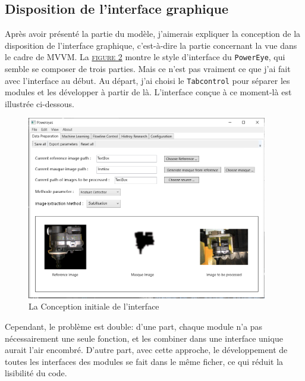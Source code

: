 \subsection{Disposition de l'interface graphique}
Après avoir présenté la partie du modèle, j'aimerais expliquer la conception de la disposition de l'interface graphique, c'est-à-dire la partie concernant la vue dans le cadre de MVVM. La \hyperref[fig:target]{\textsc{figure 2}} montre le style d'interface du \texttt{PowerEye}, qui semble se composer de trois parties. Mais ce n'est pas vraiment ce que j'ai fait avec l'interface au début. Au départ, j'ai choisi le \texttt{Tabcontrol} pour séparer les modules et les développer à partir de là. L'interface conçue à ce moment-là est illustrée ci-dessous.
\begin{figure}[H]
    \centering
    \includegraphics[height=8cm]{ressources/images/Interface_original.png}
    \caption{La Conception initiale de l'interface}
\end{figure}

Cependant, le problème est double: d'une part, chaque module n'a pas nécessairement une seule fonction, et les combiner dans une interface unique aurait l'air encombré. D'autre part, avec cette approche, le développement de toutes les interfaces des modules se fait dans le même ficher, ce qui réduit la lisibilité du code.

